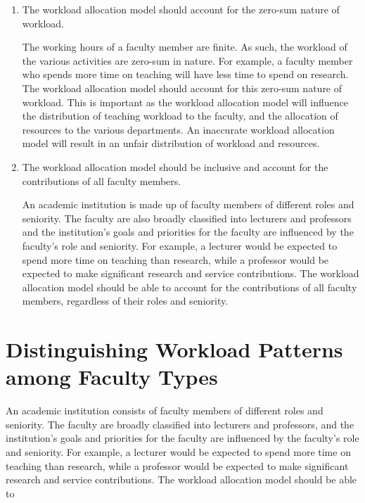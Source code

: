 \begin{enumerate}
      \item The workload allocation model should account for the zero-sum nature of workload.

            The working hours of a faculty member are finite. As such, the workload of the various activities are zero-sum in nature. For example, a faculty member who spends more time on teaching will have less time to spend on research. The workload allocation model should account for this zero-sum nature of workload. This is important as the workload allocation model will influence the distribution of teaching workload to the faculty, and the allocation of resources to the various departments. An inaccurate workload allocation model will result in an unfair distribution of workload and resources.

      \item The workload allocation model should be inclusive and account for the contributions of all faculty members.

            An academic institution is made up of faculty members of different roles and seniority. The faculty are also broadly classified into lecturers and professors and the institution's goals and priorities for the faculty are influenced by the faculty's role and seniority. For example, a lecturer would be expected to spend more time on teaching than research, while a professor would be expected to make significant research and service contributions. The workload allocation model should be able to account for the contributions of all faculty members, regardless of their roles and seniority.

\end{enumerate}


\section{Distinguishing Workload Patterns among Faculty Types}

An academic institution consists of faculty members of different roles and seniority. The faculty are broadly classified into lecturers and professors, and the institution's goals and priorities for the faculty are influenced by the faculty's role and seniority. For example, a lecturer would be expected to spend more time on teaching than research, while a professor would be expected to make significant research and service contributions. The workload allocation model should be able to


